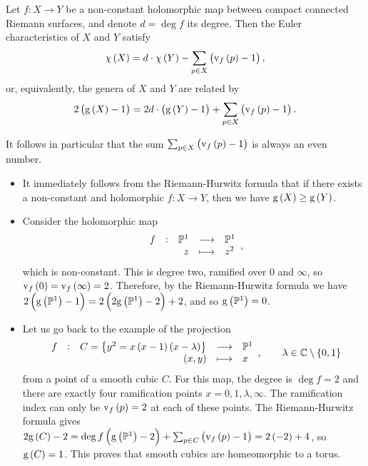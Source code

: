\begin{theorem}
Let $ f : X \to Y $ be a non-constant holomorphic map between compact connected Riemann surfaces, and denote $ d = \deg f $ its degree. Then the Euler characteristics of $ X $ and $ Y $ satisfy
$$ \chi\br{X} = d \cdot \chi\br{Y} - \sum_{p \in X} \br{\v_f\br{p} - 1}, $$
or, equivalently, the genera of $ X $ and $ Y $ are related by
$$ 2\br{\g\br{X} - 1} = 2d \cdot \br{\g\br{Y} - 1} + \sum_{p \in X} \br{\v_f\br{p} - 1}. $$
\end{theorem}

\begin{remark}
It follows in particular that the sum $ \sum_{p \in X} \br{\v_f\br{p} - 1} $ is always an even number.
\end{remark}

\begin{example}
\hfill
\begin{itemize}
\item It immediately follows from the Riemann-Hurwitz formula that if there exists a non-constant and holomorphic $ f : X \to Y $, then we have $ \g\br{X} \ge \g\br{Y} $.
\item Consider the holomorphic map
$$ \function[f]{\PP^1}{\PP^1}{z}{z^2}, $$
which is non-constant. This is degree two, ramified over $ 0 $ and $ \infty $, so $ \v_f\br{0} = \v_f\br{\infty} = 2 $. Therefore, by the Riemann-Hurwitz formula we have $ 2\br{\g\br{\PP^1} - 1} = 2\br{2\g\br{\PP^1} - 2} + 2 $, and so $ \g\br{\PP^1} = 0 $.
\item Let us go back to the example of the projection
$$ \function[f]{C = \cbr{y^2 = x\br{x - 1}\br{x - \lambda}}}{\PP^1}{\br{x, y}}{x}, \qquad \lambda \in \CC \setminus \cbr{0, 1} $$
from a point of a smooth cubic $ C $. For this map, the degree is $ \deg f = 2 $ and there are exactly four ramification points $ x = 0, 1, \lambda, \infty $. The ramification index can only be $ \v_f\br{p} = 2 $ at each of these points. The Riemann-Hurwitz formula gives $ 2\g\br{C} - 2 = \deg f\br{\g\br{\PP^1} - 2} + \sum_{p \in C} \br{\v_f\br{p} - 1} = 2\br{-2} + 4 $, so $ \g\br{C} = 1 $. This proves that smooth cubics are homeomorphic to a torus.
\end{itemize}
\end{example}

\pagebreak

